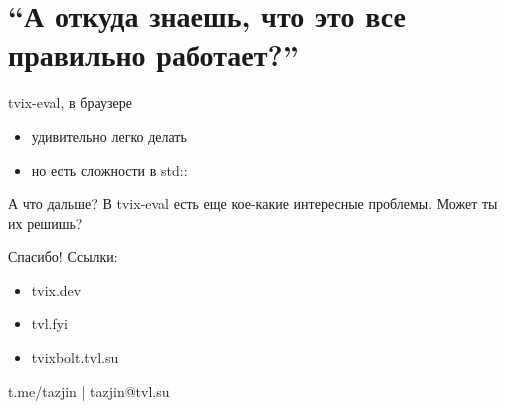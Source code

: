 \documentclass[12pt]{beamer}
\newenvironment{code}{\ttfamily}{\par}
\begin{document}
  \section{``А откуда знаешь, что это все правильно работает?''}


  \begin{frame}{tvix-eval, в браузере}
    \begin{itemize}
    \item удивительно легко делать
    \item но есть сложности в \begin{code}std::\end{code}
    \end{itemize}
  \end{frame}

  \begin{frame}{А что дальше?}
    В tvix-eval есть еще кое-какие интересные проблемы. Может ты их
    решишь?
  \end{frame}

  \begin{frame}{Спасибо!}
    Ссылки:
    \begin{itemize}
    \item tvix.dev
    \item tvl.fyi
    \item tvixbolt.tvl.su
    \end{itemize}


    \vspace{3cm}
    \begin{center}
      t.me/tazjin | tazjin@tvl.su
    \end{center}
  \end{frame}
\end{document}
